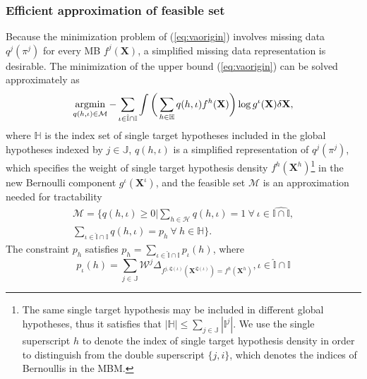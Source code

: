 \documentclass[journal]{IEEEtran}
\begin{document}
\subsubsection{Efficient approximation of feasible set}

Because the minimization problem of (\ref{eq:vaorigin}) involves missing data $q^j(\pi^j)$ for every MB $f^j(\mathbf{X})$, a simplified missing data representation is desirable. The minimization of the upper bound (\ref{eq:vaorigin}) can be solved approximately as \cite{variational}
\begin{equation}
\operatornamewithlimits{argmin}_{q(h,\iota)\in\mathcal{M}}-\sum_{\iota\in\hat{\mathbb{I}}\cap\mathbb{I}}\int\bigg(\sum_{h\in\mathbb{H}}q(h,\iota)f^h(\mathbf{X})\bigg)\log g^{\iota}(\mathbf{X})\delta\mathbf{X},
\label{eq:feasibleset}
\end{equation}
where $\mathbb{H}$ is the index set of single target hypotheses included in the global hypotheses indexed by $j\in\mathbb{J}$, $q(h,\iota)$ is a simplified representation of $q^j(\pi^j)$, which specifies the weight of single target hypothesis density $f^h(\mathbf{X}^h)$\footnote{The same single target hypothesis may be included in different global hypotheses, thus it satisfies that $|\mathbb{H}|\leq\sum_{j\in\mathbb{J}}|\mathbb{I}^j|$. We use the single superscript $h$ to denote the index of single target hypothesis density in order to distinguish from the double superscript $\{j,i\}$, which denotes the indices of Bernoullis in the MBM.} in the new Bernoulli component $g^{\iota}(\mathbf{X}^{\iota})$, and the feasible set $\mathcal{M}$ is an approximation needed for tractability
\begin{multline}
    \mathcal{M} = \Bigg\{q(h,\iota)\geq0\Bigg|\sum_{h\in\mathcal{H}}q(h,\iota)=1 ~\forall~ \iota\in\hat{\mathbb{I}\cap\mathbb{I}},\\\sum_{\iota\in\hat{\mathbb{I}}\cap\mathbb{I}}q(h,\iota)=p_h ~\forall~ h\in\mathbb{H}\Bigg\}.
    \label{eq:polytope}
\end{multline}
The constraint $p_h$ satisfies $p_h=\sum_{\iota\in\hat{\mathbb{I}}\cap\mathbb{I}}p_{\iota}(h)$, where
\begin{equation}
    p_{\iota}(h)=
      \sum_{j\in\mathbb{J}}\mathcal{W}^j\Delta_{f^{j,\mathfrak{L}(\iota)}(\mathbf{X}^{\mathfrak{L}(\iota)})=f^h(\mathbf{X}^h)}, \iota\in\hat{\mathbb{I}}\cap\mathbb{I}
\label{eq:marginalprob}
\end{equation}
\end{document}
